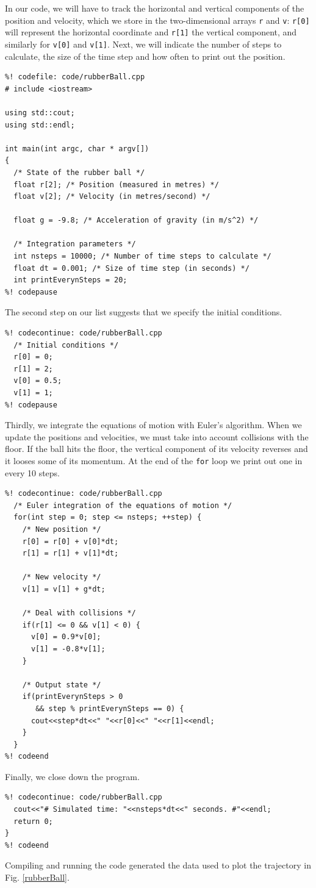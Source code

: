 In our code, we will have to track the horizontal and vertical components of the 
position and velocity, which we store in the two-dimensional arrays \texttt{r} 
and \texttt{v}: \texttt{r[0]} will represent the horizontal coordinate and 
\texttt{r[1]} the vertical component, and similarly for \texttt{v[0]} and 
\texttt{v[1]}. Next, we will indicate the number of steps to calculate, the size 
of the time step and how often to print out the position.
\begin{lstlisting}
%! codefile: code/rubberBall.cpp
# include <iostream>

using std::cout;
using std::endl;

int main(int argc, char * argv[])
{
  /* State of the rubber ball */
  float r[2]; /* Position (measured in metres) */
  float v[2]; /* Velocity (in metres/second) */

  float g = -9.8; /* Acceleration of gravity (in m/s^2) */

  /* Integration parameters */
  int nsteps = 10000; /* Number of time steps to calculate */
  float dt = 0.001; /* Size of time step (in seconds) */
  int printEverynSteps = 20;
%! codepause
\end{lstlisting}
The second step on our list suggests that we specify the initial conditions.
\begin{lstlisting}
%! codecontinue: code/rubberBall.cpp
  /* Initial conditions */
  r[0] = 0;
  r[1] = 2;
  v[0] = 0.5;
  v[1] = 1;
%! codepause
\end{lstlisting}
Thirdly, we integrate the equations of motion with Euler's algorithm. When we
update the positions and velocities, we must take into account collisions with
the floor. If the ball hits the floor, the vertical component of its velocity
reverses and it looses some of its momentum. At the end of the \texttt{for}
loop we print out one in every 10 steps.
\begin{lstlisting}
%! codecontinue: code/rubberBall.cpp
  /* Euler integration of the equations of motion */
  for(int step = 0; step <= nsteps; ++step) {
    /* New position */
    r[0] = r[0] + v[0]*dt;
    r[1] = r[1] + v[1]*dt;

    /* New velocity */
    v[1] = v[1] + g*dt;

    /* Deal with collisions */
    if(r[1] <= 0 && v[1] < 0) {
      v[0] = 0.9*v[0];
      v[1] = -0.8*v[1];
    }

    /* Output state */
    if(printEverynSteps > 0
       && step % printEverynSteps == 0) {
      cout<<step*dt<<" "<<r[0]<<" "<<r[1]<<endl;
    }
  }
%! codeend
\end{lstlisting}
Finally, we close down the program.
\begin{lstlisting}
%! codecontinue: code/rubberBall.cpp
  cout<<"# Simulated time: "<<nsteps*dt<<" seconds. #"<<endl;
  return 0;
}
%! codeend
\end{lstlisting}
Compiling and running the code generated the data used to plot the trajectory
in Fig. \ref{rubberBall}.

